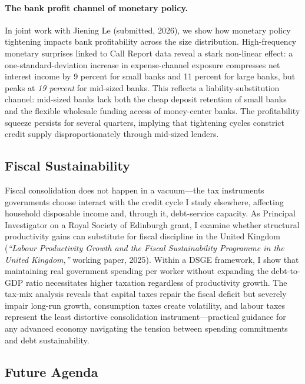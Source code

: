 \documentclass[12pt,a4paper]{article}
\begin{document}
\paragraph{The bank profit channel of monetary policy.} In joint work with Jiening Le (submitted, 2026), we show how monetary policy tightening impacts bank profitability across the size distribution. High-frequency monetary surprises linked to Call Report data reveal a stark non-linear effect: a one-standard-deviation increase in expense-channel exposure compresses net interest income by 9 percent for small banks and 11 percent for large banks, but peaks at \emph{19 percent} for mid-sized banks. This reflects a liability-substitution channel: mid-sized banks lack both the cheap deposit retention of small banks and the flexible wholesale funding access of money-center banks. The profitability squeeze persists for several quarters, implying that tightening cycles constrict credit supply disproportionately through mid-sized lenders.

\subsection*{Fiscal Sustainability}
\vspace{-0.3cm}

Fiscal consolidation does not happen in a vacuum---the tax instruments governments choose interact with the credit cycle I study elsewhere, affecting household disposable income and, through it, debt-service capacity. As Principal Investigator on a Royal Society of Edinburgh grant, I examine whether structural productivity gains can substitute for fiscal discipline in the United Kingdom (\textit{``Labour Productivity Growth and the Fiscal Sustainability Programme in the United Kingdom,''} working paper, 2025). Within a DSGE framework, I show that maintaining real government spending per worker without expanding the debt-to-GDP ratio necessitates higher taxation regardless of productivity growth. The tax-mix analysis reveals that capital taxes repair the fiscal deficit but severely impair long-run growth, consumption taxes create volatility, and labour taxes represent the least distortive consolidation instrument---practical guidance for any advanced economy navigating the tension between spending commitments and debt sustainability.

\subsection*{Future Agenda}
\vspace{-0.3cm}
\end{document}
